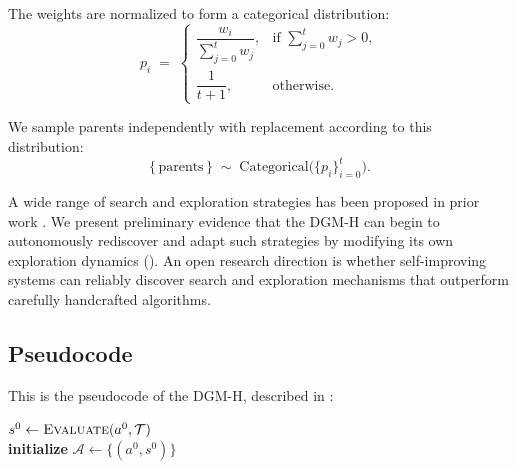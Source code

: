 \documentclass[]{fairmeta}
\begin{document}
The weights are normalized to form a categorical distribution:
\[
p_i \;=\;
\begin{cases}
\dfrac{w_i}{\sum_{j=0}^t w_j}, & \text{if } \sum_{j=0}^t w_j > 0, \\[10pt]
\dfrac{1}{t+1}, & \text{otherwise}.
\end{cases}
\]

We sample parents independently with replacement according to this distribution:
\[
\{\,\text{parents}\,\}
\;\sim\;
\mathrm{Categorical}\bigl(\{p_i\}_{i=0}^t\bigr).
\]

A wide range of search and exploration strategies has been proposed in prior work \citep{coulom2006efficient, silver2016mastering, herr2025llm, wang2025huxley, weng2026group}. We present preliminary evidence that the DGM-H can begin to autonomously rediscover and adapt such strategies by modifying its own exploration dynamics (). An open research direction is whether self-improving systems can reliably discover search and exploration mechanisms that outperform carefully handcrafted algorithms.

\subsection{Pseudocode}
\label{app:pseudocode}

This is the pseudocode of the DGM-H, described in :

\begin{algorithm}[H]
\DontPrintSemicolon
\SetAlgoLined
{}
\BlankLine
$s^{0} \leftarrow \textsc{Evaluate}(a^{0}, \mathcal{T})$ \\
\textbf{initialize} $\mathcal{A} \leftarrow \{(a^{0}, s^{0})\}$ 
\caption{Darwin G\"odel Machine with Hyperagents (DGM-H)}
\label{algo:DGM-H}
\end{algorithm}
\end{document}
